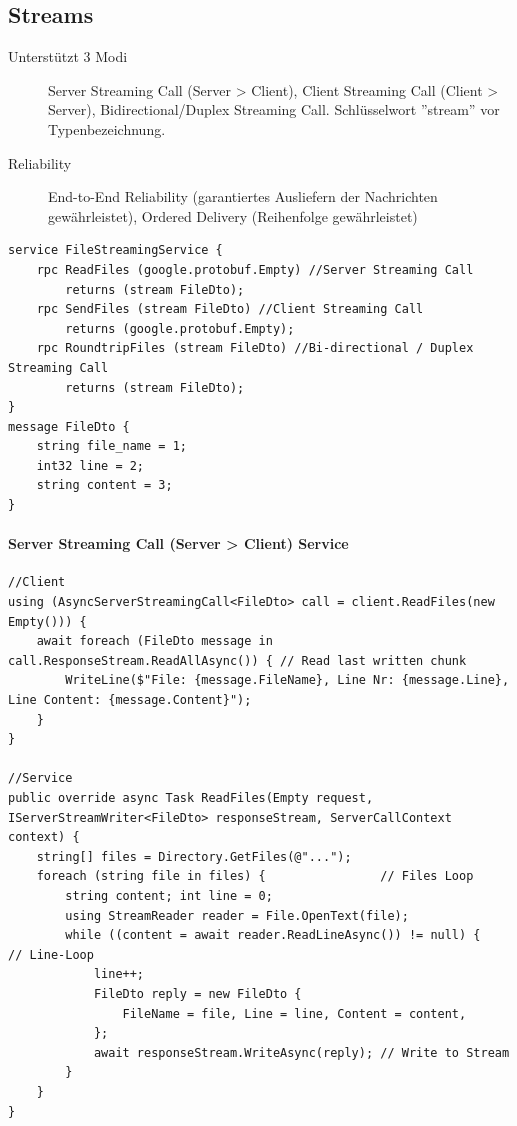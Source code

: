 \documentclass[
a4paper,
oneside,
10pt,
fleqn,
headsepline,
toc=listofnumbered, 
bibliography=totocnumbered]{scrartcl}
\begin{document}
\subsection{Streams}
\begin{description}
    \item[Unterstützt 3 Modi] Server Streaming Call (Server > Client), Client Streaming Call (Client > Server), Bidirectional/Duplex Streaming Call. Schlüsselwort ''stream'' vor Typenbezeichnung.
    \item[Reliability] End-to-End Reliability (garantiertes Ausliefern der Nachrichten gewährleistet), Ordered Delivery (Reihenfolge gewährleistet)
\end{description}
\begin{lstlisting}
service FileStreamingService {
    rpc ReadFiles (google.protobuf.Empty) //Server Streaming Call
        returns (stream FileDto);
    rpc SendFiles (stream FileDto) //Client Streaming Call
        returns (google.protobuf.Empty);
    rpc RoundtripFiles (stream FileDto) //Bi-directional / Duplex Streaming Call
        returns (stream FileDto);
}
message FileDto {
    string file_name = 1;
    int32 line = 2;
    string content = 3;
}
\end{lstlisting}

\paragraph{Server Streaming Call (Server > Client) Service}
\begin{lstlisting}
//Client
using (AsyncServerStreamingCall<FileDto> call = client.ReadFiles(new Empty())) {
    await foreach (FileDto message in call.ResponseStream.ReadAllAsync()) { // Read last written chunk
        WriteLine($"File: {message.FileName}, Line Nr: {message.Line}, Line Content: {message.Content}");
    }
}

//Service
public override async Task ReadFiles(Empty request, IServerStreamWriter<FileDto> responseStream, ServerCallContext context) {
    string[] files = Directory.GetFiles(@"...");
    foreach (string file in files) {                // Files Loop
        string content; int line = 0;
        using StreamReader reader = File.OpenText(file);
        while ((content = await reader.ReadLineAsync()) != null) {      // Line-Loop
            line++;
            FileDto reply = new FileDto {
                FileName = file, Line = line, Content = content,
            };
            await responseStream.WriteAsync(reply); // Write to Stream
        }
    }
}
\end{lstlisting}
\end{document}
